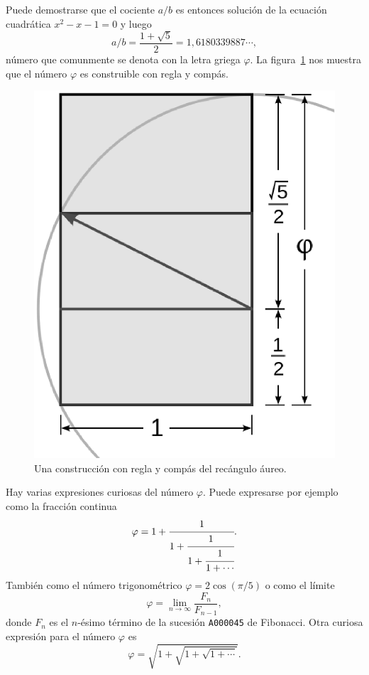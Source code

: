 Puede demostrarse que el cociente $a/b$ es entonces solución de la ecuación
cuadrática $x^2-x-1=0$ y luego 
\[
	a/b=\frac{1+\sqrt{5}}{2}=1,6180339887\cdots,
\]
número que comunmente se denota con la letra griega $\varphi$.  La
figura~\ref{fig:construction} nos muestra que el número $\varphi$ es
construible con regla y compás. 

\begin{figure}
   \centering
   \includegraphics[scale=0.25]{images/construction}
   \caption{Una construcción con regla y compás del recángulo áureo.}
   \label{fig:construction}
\end{figure}

Hay varias expresiones curiosas del número $\varphi$. Puede expresarse por ejemplo como
la fracción continua 
\[
	\varphi=1+\cfrac{1}{1+\cfrac{1}{1+\cfrac{1}{1+\cdots}}}.
\]
También como el número trigonométrico 
$\varphi=2\cos(\pi/5)$ o 
como el límite
\[
	\varphi=\lim_{n\to\infty}\frac{F_n}{F_{n-1}},
\]
donde $F_n$ es el $n$-ésimo término de la sucesión \verb+A000045+ de Fibonacci. 
Otra curiosa expresión para el número $\varphi$ es 
\[
	\varphi=\sqrt{1+\sqrt{1+\sqrt{1+\cdots}}}.
\]


